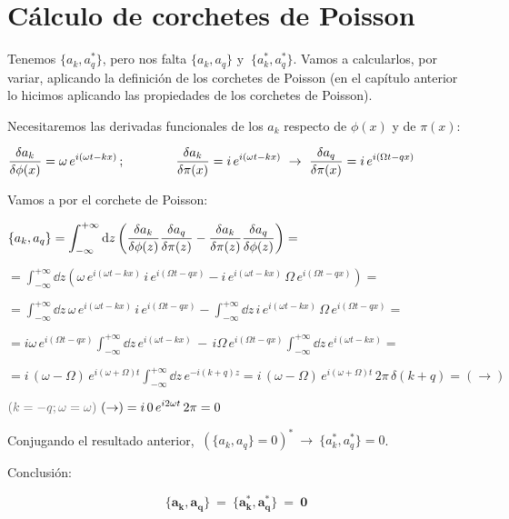 \section{Cálculo de corchetes de Poisson}

Tenemos $\{a_k,a^*_q\}$, pero nos falta $\{a_k,a_q\} \text{ y } \ \{a^*_k,a^*_q\}$. Vamos a calcularlos, por variar, aplicando la definición de los corchetes de Poisson (en el capítulo anterior lo hicimos aplicando las propiedades de los corchetes de Poisson).

Necesitaremos las derivadas funcionales de los $a_k$ respecto de $\phi(x)$ y de $\pi(x)$:

$\displaystyle \fdv{a_k}{\phi(x)}= \omega\, e^{i(\omega t-kx)}\, ; \qquad \qquad  \fdv{a_k}{\pi(x)}= i\, e^{i(\omega t-kx)} \ \to \ \fdv{a_q}{\pi(x)}= i\, e^{i(\Omega t-qx)}$

Vamos a por el corchete de Poisson:

$\displaystyle  \{a_k,a_q\}=\int_{-\infty}^{+\infty} \dd z \left( \fdv{a_k}{\phi(z)} \fdv{a_q}{\pi(z)} - \fdv{a_k}{\pi(z)} \fdv{a_q}{\phi(z)}  \right) = $

$\displaystyle =
\int_{-\infty}^{+\infty} \dd z \left(
\omega \, e^{i(\omega t-kx)} \,i\,  e^{i(\Omega t-qx)}  -  i\, e^{i(\omega t-kx)} \, \Omega \,  e^{i(\Omega t-qx)}
 \right) = $
 
 $\displaystyle =
 \int_{-\infty}^{+\infty} \dd z \, 
\omega\, e^{i(\omega t-kx)} \,i\,  e^{i(\Omega t-qx)}   -
 \int_{-\infty}^{+\infty} \dd z \, 
 i\, e^{i(\omega t-kx)} \, \Omega \,  e^{i(\Omega t-qx)}
= $

 $\displaystyle =
i\omega \,  e^{i(\Omega t-qx)} 
 \int_{-\infty}^{+\infty} \dd z \, 
e^{i(\omega t-kx)}   \, - \, 
i \Omega \,  e^{i(\Omega t-qx)}
  \int_{-\infty}^{+\infty} \dd z \, 
 e^{i(\omega t-kx)} 
= $

$\displaystyle =
i \, (\omega-\Omega) \,  e^{i(\omega+\Omega)t} 
 \int_{-\infty}^{+\infty} \dd z \, e^{-i(k+q)z} =
i \, (\omega-\Omega) \,  e^{i(\omega+\Omega)t} \, 2\pi\, \delta(k+q) = (\to)$

$\displaystyle 
\textcolor{gris}{( k=-q; \omega=\omega ) } \ (\to) = i\, 0\, e^{i2\omega t} \, 2\pi = 0 $

Conjugando el resultado anterior, $\ \left( \{a_k,a_q\}=0 \right)^* \ \to \ \{a^*_k,a^*_q\}=0$.

Conclusión:

\begin{equation}
\label{T42-a,a-y-a,a^*}	
\boxed{ \ \boldsymbol{
 \{a_k,a_q\} \ = \  \{a^*_k,a^*_q\} \ = \ 0
} \ }
\end{equation}




